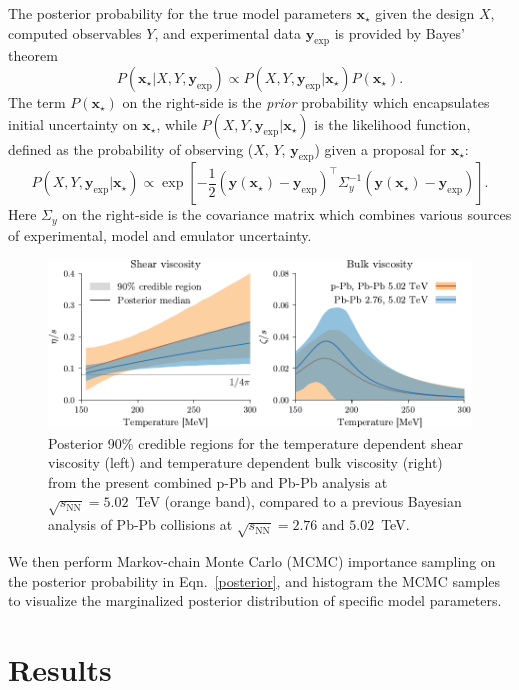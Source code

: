 \documentclass[3p,times,procedia,sort&compress]{elsarticle}
\newcommand{\sqrts}{\sqrt{s_\mathrm{NN}}}
\begin{document}
The posterior probability for the true model parameters $\mathbf{x_\star}$ given the design $X$, computed observables $Y$, and experimental data $\mathbf{y}_\mathrm{exp}$ is provided by Bayes' theorem
\begin{equation}
  \label{posterior}
  P(\mathbf{x_\star}| X, Y, \mathbf{y}_\mathrm{exp}) \propto P(X, Y, \mathbf{y}_\mathrm{exp} | \mathbf{x_\star}) P(\mathbf{x_\star}).
\end{equation}
The term $P(\mathbf{x_\star})$ on the right-side is the \emph{prior} probability which encapsulates initial uncertainty on $\mathbf{x_\star}$, while $P(X, Y, \mathbf{y}_\mathrm{exp} | \mathbf{x_\star})$ is the likelihood function, defined as the probability of observing ($X$, $Y$, $\mathbf{y}_\text{exp}$) given a proposal for $\mathbf{x}_\star$:
\begin{equation}
  P(X, Y, \mathbf{y}_\mathrm{exp} | \mathbf{x_\star}) \propto \exp \left[ -\frac{1}{2}(\mathbf{y}(\mathbf{x_\star}) - \mathbf{y}_\mathrm{exp})^\top \Sigma_y^{-1} (\mathbf{y}(\mathbf{x_\star}) - \mathbf{y}_\mathrm{exp}) \right].
\end{equation}
Here $\Sigma_y$ on the right-side is the covariance matrix which combines various sources of experimental, model and emulator uncertainty.
\begin{figure}
  \centering
  \includegraphics[width=.9\textwidth]{region_shear_bulk}
  \caption{Posterior 90\% credible regions for the temperature dependent shear viscosity (left) and temperature dependent bulk viscosity (right) from the present combined p-Pb and Pb-Pb analysis at $\sqrts=5.02$~TeV (orange band), compared to a previous Bayesian analysis of Pb-Pb collisions at $\sqrts=2.76$ and $5.02$~TeV.}
  \label{fig:viscosity}
\end{figure}
We then perform Markov-chain Monte Carlo (MCMC) importance sampling on the posterior probability in Eqn.~\eqref{posterior}, and histogram the MCMC samples to visualize the marginalized posterior distribution of specific model parameters.

\section{Results}
\end{document}
